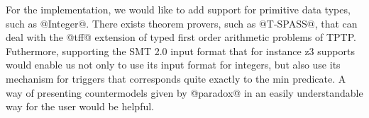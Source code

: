 For the implementation, we would like to add support for primitive
data types, such as @Integer@. There exists theorem provers, such as
@T-SPASS@, that can deal with the @tff@ extension of typed first order
arithmetic problems of TPTP. Futhermore, supporting the SMT 2.0 input
format that for instance z3 supports would enable us not only to use
its input format for integers, but also use its mechanism for triggers
that corresponds quite exactly to the min predicate. A way of
presenting countermodels given by @paradox@ in an easily
understandable way for the user would be helpful.

